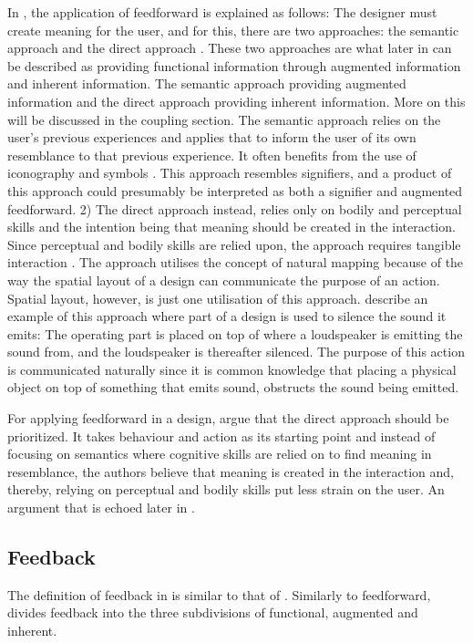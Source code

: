 In , the application of feedforward is explained as follows: The designer must create meaning for the user, and for this, there are two approaches: the semantic approach and the direct approach \cite{howdonald}. These two approaches are what later in  can be described as providing functional information through augmented information and inherent information. The semantic approach providing augmented information and the direct approach providing inherent information. More on this will be discussed in the coupling section. The semantic approach relies on the user's previous experiences and applies that to inform the user of its own resemblance to that previous experience. It often benefits from the use of iconography and symbols \cite{howdonald}. This approach resembles signifiers, and a product of this approach could presumably be interpreted as both a signifier and augmented feedforward. 2) The direct approach instead, relies only on bodily and perceptual skills and the intention being that meaning should be created in the interaction. Since perceptual and bodily skills are relied upon, the approach requires tangible interaction \cite{howdonald}. The approach utilises the concept of natural mapping because of the way the spatial layout of a design can communicate the purpose of an action. Spatial layout, however, is just one utilisation of this approach.  describe an example of this approach where part of a design is used to silence the sound it emits: The operating part is placed on top of where a loudspeaker is emitting the sound from, and the loudspeaker is thereafter silenced. The purpose of this action is communicated naturally since it is common knowledge that placing a physical object on top of something that emits sound, obstructs the sound being emitted.

For applying feedforward in a design,  argue that the direct approach should be prioritized. It takes behaviour and action as its starting point and instead of focusing on semantics where cognitive skills are relied on to find meaning in resemblance, the authors believe that meaning is created in the interaction and, thereby, relying on perceptual and bodily skills put less strain on the user. An argument that is echoed later in .

\subsection{Feedback} The definition of feedback in  is similar to that of . Similarly to feedforward,  divides feedback into the three subdivisions of functional, augmented and inherent.
